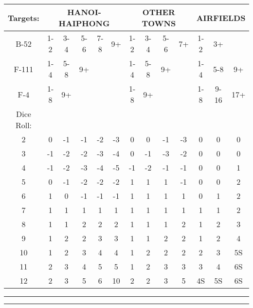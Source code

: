 
\newcommand{\targets}{\multicolumn{1}{l}{Targets:}}
\newcommand{\hanoi}{\multicolumn{5}{c}{HANOI-HAIPHONG}}
\newcommand{\other}{\multicolumn{4}{c}{OTHER TOWNS}}
\newcommand{\airfields}{\multicolumn{3}{c}{AIRFIELDS}}

{\ttfamily
\begin{tabular}{|c|ccccc|cccc|ccc|}
  \targets &  \hanoi  &  \other   &  \airfields\\\hline 
  B-52  & 1-2 & 3-4 & 5-6 & 7-8 & 9+ & 1-2 & 3-4 & 5-6 & 7+ & 1-2 & 3+   & \\
  F-111 & 1-4 & 5-8 & 9+  &     &    & 1-4 & 5-8 & 9+  &    & 1-4 & 5-8  & 9+ \\
  F-4   & 1-8 & 9+  &     &     &    & 1-8 & 9+  &     &    & 1-8 & 9-16 & 17+ \\\hline
  \makecell{Dice\\Roll: }& & & & & & & & & & & &  \\
  2 & 0  & -1 & -1 & -2 & -3 &  0 &  0 & -1 & -3 &  0 & 0 & 0 \\
  3 & -1 & -2 & -2 & -3 & -4 &  0 & -1 & -3 & -2 &  0 & 0 & 0 \\
  4 & -1 & -2 & -3 & -4 & -5 & -1 & -2 & -1 & -1 &  0 & 0 & 1 \\
  5 & 0  & -1 & -2 & -2 & -2 &  1 &  1 &  1 & -1 &  0 & 0 & 2 \\
  6 & 1  &  0 & -1 & -1 & -1 &  1 &  1 &  1 &  1 &  0 & 1 & 2 \\
  7 & 1  &  1 &  1 &  1 &  1 &  1 &  1 &  1 &  1 &  1 & 1 & 2 \\
  8 & 1  &  1 &  2 &  2 &  2 &  1 &  1 &  1 &  2 &  1 & 2 & 3 \\
  9 & 1  &  2 &  2 &  3 &  3 &  1 &  1 &  2 &  2 &  1 & 2 & 4 \\
  10 & 1 &  2 &  3 &  4 &  4 &  1 &  2 &  2 &  2 &  2 & 3 & 5S \\
  11 & 2 &  3 &  4 &  5 &  5 &  1 &  2 &  3 &  3 &  3 & 4 & 6S \\
  12 & 2 &  3 &  5 &  6 & 10 &  2 &  2 & 3  &  5 &  4S & 5S & 6S   \\\hline 
\end{tabular}
}

\vspace{1em}
\hrule
\vspace{1em}
\hrule
